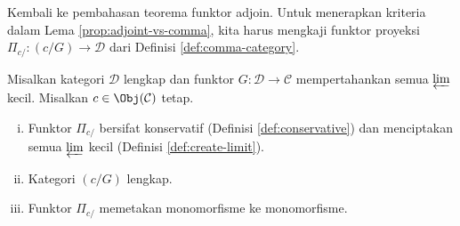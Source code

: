 Kembali ke pembahasan teorema funktor adjoin. Untuk menerapkan kriteria dalam
Lema \ref{prop:adjoint-vs-comma}, kita harus mengkaji funktor proyeksi
$\Pi_{c/}:(c/G)\to\mathcal{D}$ dari Definisi
\ref{def:comma-category}.

\begin{proposisi}\label{prop:comma-cat-completeness}
	Misalkan kategori $\mathcal{D}$ lengkap dan funktor
	$G:\mathcal{D}\to\mathcal{C}$ mempertahankan semua $\varprojlim$ kecil.
	Misalkan $c\in\Obj(\mathcal{C})$ tetap.
	\begin{enumerate}[(i)]
		\item Funktor $\Pi_{c/}$ bersifat konservatif (Definisi
		\ref{def:conservative}) dan menciptakan semua $\varprojlim$ kecil
		(Definisi \ref{def:create-limit}).
		\item Kategori $(c/G)$ lengkap.
		\item Funktor $\Pi_{c/}$ memetakan monomorfisme ke monomorfisme.
	\end{enumerate}
\end{proposisi}
